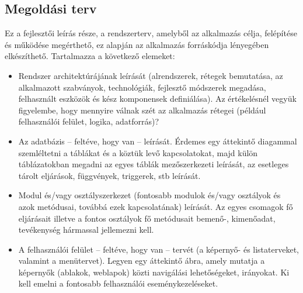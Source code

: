 \subsection{Megoldási terv}
Ez a fejlesztői leírás része, a rendszerterv, amelyből az alkalmazás célja, felépítése és működése megérthető, ez alapján az alkalmazás forráskódja lényegében elkészíthető.
    Tartalmazza a következő elemeket:
\begin{itemize}
    \item Rendszer architektúrájának leírását (alrendszerek, rétegek bemutatása, az alkalmazott szabványok, technológiák, fejlesztő módszerek megadása, felhasznált eszközök és kész komponensek definiálása). Az értékelésnél vegyük figyelembe, hogy mennyire válnak szét az alkalmazás rétegei (például felhasználói felület, logika, adatforrás)?
    \item Az adatbázis – feltéve, hogy van – leírását. Érdemes egy áttekintő diagammal szemléltetni a táblákat és a köztük levő kapcsolatokat, majd külön táblázatokban megadni az egyes táblák mezőszerkezeti leírását, az esetleges tárolt eljárások, függvények, triggerek, stb leírását.
    \item Modul és/vagy osztályszerkezet (fontosabb modulok és/vagy osztályok és azok metódusai, továbbá ezek kapcsolatának) leírását. Az egyes csomagok fő eljárásait illetve a fontos osztályok fő metódusait bemenő-, kimenőadat, tevékenység hármassal jellemezni kell.
    \item A felhasználói felület – feltéve, hogy van –  tervét (a képernyő- és listaterveket, valamint a menütervet). Legyen egy áttekintő ábra, amely mutatja a képernyők (ablakok, weblapok) közti navigálási lehetőségeket, irányokat. Ki kell emelni a fontosabb felhasználói eseménykezeléseket.
\end{itemize}

